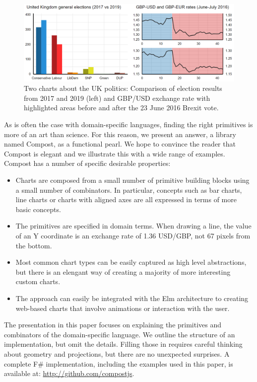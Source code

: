 \documentclass{jfp}
\newcommand{\urrl}[1]{\textnormal{\textcolor{urlclr}{\url{#1}}}}
\begin{document}
\begin{figure}[h]
  \includegraphics[scale=0.57]{figures/charts}
  \vspace{0.25em}
  \caption{Two charts about the UK politics: Comparison of election results from 2017 and 2019 (left)
    and GBP/USD exchange rate with highlighted areas before and after the 23 June 2016 Brexit vote.}
  \label{fig:charts}
\end{figure}

As is often the case with domain-specific languages, finding the right primitives is more of an art
than science. For this reason, we present an answer, a library named Compost, as a functional pearl.
We hope to convince the reader that Compost is elegant and we illustrate this with a wide range
of examples. Compost has a number of specific desirable properties:

\begin{itemize}
\item Charts are composed from a small number of primitive building blocks using a small number of
  combinators. In particular, concepts such as bar charts, line charts or charts with aligned
  axes are all expressed in terms of more basic concepts.
\item The primitives are specified in domain terms. When drawing a line, the value of an Y coordinate
  is an exchange rate of 1.36 USD/GBP, not 67 pixels from the bottom.
\item Most common chart types can be easily captured as high level abstractions, but there is an
  elengant way of creating a majority of more interesting custom charts.
\item The approach can easily be integrated with the Elm architecture \cite{elm}
	to creating web-based charts that involve animations or interaction with the user.
\end{itemize}
%
The presentation in this paper focuses on explaining the primitives and combinators of the
domain-specific language. We outline the structure of an implementation, but omit the details. Filling
those in requires careful thinking about geometry and projections, but there are no unexpected
surprises. A complete F\# implementation, including the examples used in this paper, is available
at: \urrl{http://github.com/compostjs}.
\end{document}
